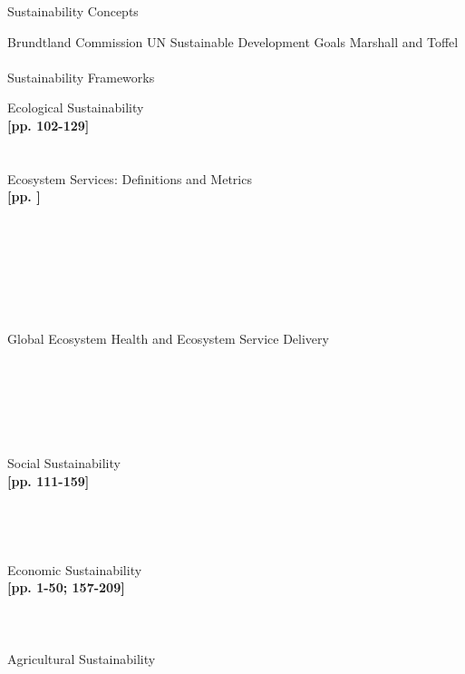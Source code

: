 \documentclass[12pt, letterpaper]{article}
\begin{document}
\begin{outline}[enumerate]
\1 Sustainability Concepts

\2 Brundtland Commission
\2 UN Sustainable Development Goals
\2 Marshall and Toffel\\
\textit{\cite{marshall_framing_2005}}\\

\1 Sustainability Frameworks

\2 Ecological Sustainability\\
\cite{pearce_blueprint_2000} \textbf{[pp. 102-129]}\\
\cite{folke_regime_2004}\\
\cite{schnaiberg_treadmill_2002}\\

\3 Ecosystem Services: Definitions and Metrics\\
\cite{millennium_ecosystem_assessment_program_ecosystems_2005} \textbf{[pp. ]}\\
\cite{wallace_classification_2007}\\
\cite{nelson_modeling_2009}\\
\cite{costanza_value_1997}\\
\cite{kremen_managing_2005}\\
\cite{muradian_reconciling_2010}\\
\cite{niemela_using_2010}\\
\cite{norgaard_ecosystem_2010}\\

\3 Global Ecosystem Health and Ecosystem Service Delivery\\
\cite{zhao_drought-induced_2010}\\
\cite{hoegh-guldberg_impact_2010}\\
\cite{lobell_climate_2011}\\
\cite{dodds_human_2013}\\
\cite{rogers_facing_2008}\\
\cite{eigenbrod_impact_2011}\\

\2 Social Sustainability\\
\cite{sen_development_2000}\textbf{[pp. 111-159]}\\
\cite{pastor_environmental_2007}\\
\cite{miringoff_growing_1996}\\
\cite{oecd_well-being_2001}\\
\cite{berbes-blazquez_towards_2016}\\

\2 Economic Sustainability\\
\cite{pearce_blueprint_2000} \textbf{[pp. 1-50; 157-209]}\\
\cite{costanza_natural_1992}\\
\cite{daly_economics_1974}\\
\cite{goodwin_five_2003}\\

\2 Agricultural Sustainability

\end{outline}









\clearpage 
\renewcommand{\thepage}{}
\printbibliography
\end{document}
